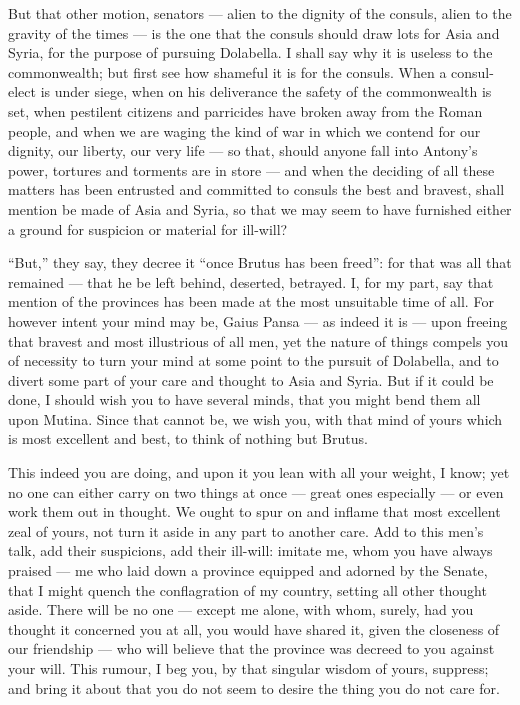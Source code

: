  But that other motion, senators --- alien to the dignity of the consuls, alien to the gravity of the times --- is the one that the consuls should draw lots for Asia and Syria, for the purpose of pursuing Dolabella. I shall say why it is useless to the commonwealth; but first see how shameful it is for the consuls. When a consul-elect is under siege, when on his deliverance the safety of the commonwealth is set, when pestilent citizens and parricides have broken away from the Roman people, and when we are waging the kind of war in which we contend for our dignity, our liberty, our very life --- so that, should anyone fall into Antony's power, tortures and torments are in store --- and when the deciding of all these matters has been entrusted and committed to consuls the best and bravest, shall mention be made of Asia and Syria, so that we may seem to have furnished either a ground for suspicion or material for ill-will?

 ``But,'' they say, they decree it ``once Brutus has been freed'': for that was all that remained --- that he be left behind, deserted, betrayed. I, for my part, say that mention of the provinces has been made at the most unsuitable time of all. For however intent your mind may be, Gaius Pansa --- as indeed it is --- upon freeing that bravest and most illustrious of all men, yet the nature of things compels you of necessity to turn your mind at some point to the pursuit of Dolabella, and to divert some part of your care and thought to Asia and Syria. But if it could be done, I should wish you to have several minds, that you might bend them all upon Mutina. Since that cannot be, we wish you, with that mind of yours which is most excellent and best, to think of nothing but Brutus.

 This indeed you are doing, and upon it you lean with all your weight, I know; yet no one can either carry on two things at once --- great ones especially --- or even work them out in thought. We ought to spur on and inflame that most excellent zeal of yours, not turn it aside in any part to another care. Add to this men's talk, add their suspicions, add their ill-will: imitate me, whom you have always praised --- me who laid down a province equipped and adorned by the Senate, that I might quench the conflagration of my country, setting all other thought aside. There will be no one --- except me alone, with whom, surely, had you thought it concerned you at all, you would have shared it, given the closeness of our friendship --- who will believe that the province was decreed to you against your will. This rumour, I beg you, by that singular wisdom of yours, suppress; and bring it about that you do not seem to desire the thing you do not care for.

